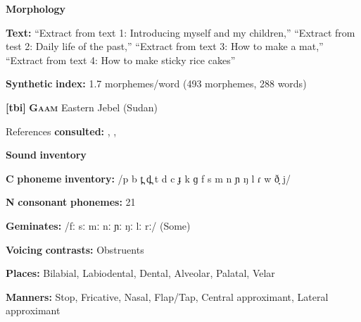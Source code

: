 \begin{styleBody}
\textbf{Morphology}
\end{styleBody}

\begin{styleBody}
\textbf{Text:} “Extract from text 1: Introducing myself and my children,” “Extract from test 2: Daily life of the past,” “Extract from text 3: How to make a mat,” “Extract from text 4: How to make sticky rice cakes” \citep[365-372]{Pan2012}
\end{styleBody}

\begin{styleBody}
\textbf{Synthetic} \textbf{index:} 1.7 morphemes/word (493 morphemes, 288 words)
\end{styleBody}

\begin{styleBody}
\textbf{[tbi]}   \textbf{\textsc{Gaam}}  Eastern Jebel (Sudan)
\end{styleBody}

\begin{styleBody}
References \textbf{consulted:} \citet{Bender1983}, \citet{Crewe1975}, \citet{Stirtz2011}
\end{styleBody}

\begin{styleBody}
\textbf{Sound} \textbf{inventory}
\end{styleBody}

\begin{styleBody}
\textbf{C} \textbf{phoneme} \textbf{inventory:} /p b t̪ d̪ t d c ɟ k ɡ f s m n ɲ ŋ l ɾ w ð̞ j/
\end{styleBody}

\begin{styleBody}
\textbf{N} \textbf{consonant} \textbf{phonemes:} 21
\end{styleBody}

\begin{styleBody}
\textbf{Geminates:} /fː sː mː nː ɲː ŋː lː rː/ (Some)
\end{styleBody}

\begin{styleBody}
\textbf{Voicing} \textbf{contrasts:} Obstruents
\end{styleBody}

\begin{styleBody}
\textbf{Places:} Bilabial, Labiodental, Dental, Alveolar, Palatal, Velar
\end{styleBody}

\begin{styleBody}
\textbf{Manners:} Stop, Fricative, Nasal, Flap/Tap, Central approximant, Lateral approximant
\end{styleBody}

